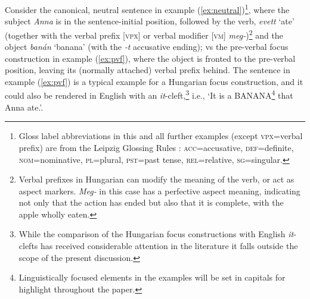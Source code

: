 \documentclass[a4paper, ruler]{CUP-JNL-LIN}%
\begin{document}
Consider the canonical, neutral sentence in example (\ref{ex:neutral})\footnote{Gloss label abbreviations in this and all further examples (except \textsc{vpx}=verbal prefix) are from the Leipzig Glossing Rules \citep{comrie_2015_leipzig}: \textsc{acc}=accusative, \textsc{def}=definite, \textsc{nom}=nominative, \textsc{pl}=plural, \textsc{pst}=past tense, \textsc{rel}=relative, \textsc{sg}=singular.}, where the subject \textit{Anna} is in the sentence-initial position, followed by the verb, \textit{evett} `ate' (together with the verbal prefix [\textsc{vpx}] or verbal modifier [\textsc{vm}] \textit{meg-})\footnote{Verbal prefixes in Hungarian can modify the meaning of the verb, or act as aspect markers. \textit{Meg-} in this case has a perfective aspect meaning, indicating not only that the action has ended but also that it is complete, with the apple wholly eaten.} and the object \textit{banán} `banana' (with the \textit{-t} accusative ending); vs the pre-verbal focus construction in example (\ref{ex:pvf}), where the object is fronted to the pre-verbal position, leaving its (normally attached) verbal prefix behind. The sentence in example (\ref{ex:pvf}) is a typical example for a Hungarian focus construction, and it could also be rendered in English with an \textit{it}-cleft,\footnote{While the comparison of the Hungarian focus constructions with English \textit{it}-clefts has received considerable attention in the literature \citep[cf.][]{ekiss_1999_english,wedgwood_2006_hungarian} it falls outside the scope of the present discussion.} i.e., `It is a BANANA\footnote{Linguistically focused elements in the examples will be set in capitals for highlight throughout the paper.} that Anna ate.'.
\end{document}
